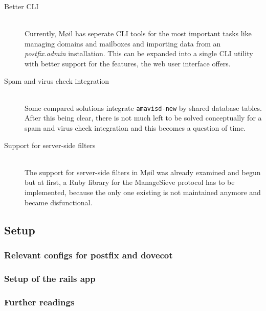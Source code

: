 \documentclass[12pt,a4paper]{scrartcl}
\begin{document}
			\begin{description}
				\item[\rm Better \ac{CLI}]\ \\
					Currently, Møil has seperate \ac{CLI} tools for the most
					important tasks like managing domains and mailboxes and
					importing data from an \emph{postfix.admin} installation.
					This can be expanded into a single \ac{CLI} utility with
					better support for the features, the web user interface
					offers.

				\item[\rm Spam and virus check integration]\ \\
					Some compared solutions integrate \texttt{amavisd-new} by
					shared database tables. After this being clear, there is
					not much left to be solved conceptually for a spam and
					virus check integration and this becomes a question of time.

				\item[\rm Support for server-side filters]\ \\
					The support for server-side filters in Møil was already
					examined and begun but at first, a Ruby library for the
					ManageSieve protocol has to be implemented, because the
					only one existing is not maintained anymore and became
					disfunctional.
			\end{description}

		\subsection*{Setup}
			\subsubsection*{Relevant configs for postfix and dovecot}

			\subsubsection*{Setup of the rails app}

			\subsubsection*{Further readings}

	\appendix

	\newpage
\end{document}
